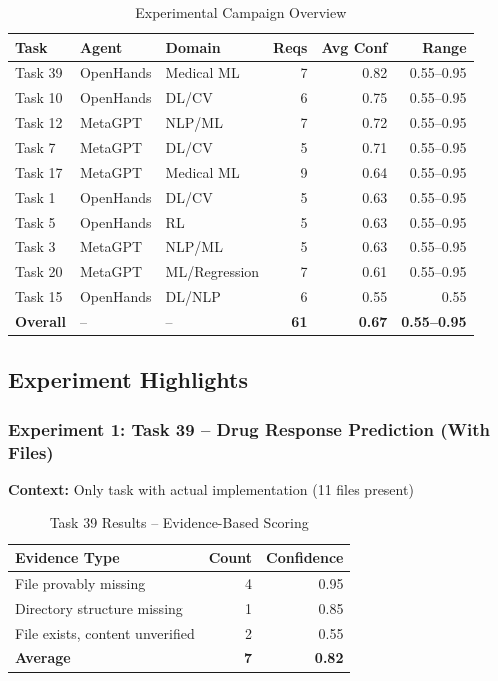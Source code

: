 \documentclass[11pt,a4paper]{article}
\begin{document}
\begin{table}[H]
\centering
\caption{Experimental Campaign Overview}
\begin{tabularx}{\textwidth}{llXrrr}
\toprule
\textbf{Task} & \textbf{Agent} & \textbf{Domain} & \textbf{Reqs} & \textbf{Avg Conf} & \textbf{Range} \\
\midrule
Task 39 & OpenHands & Medical ML & 7 & 0.82 & 0.55--0.95 \\
Task 10 & OpenHands & DL/CV & 6 & 0.75 & 0.55--0.95 \\
Task 12 & MetaGPT & NLP/ML & 7 & 0.72 & 0.55--0.95 \\
Task 7 & MetaGPT & DL/CV & 5 & 0.71 & 0.55--0.95 \\
Task 17 & MetaGPT & Medical ML & 9 & 0.64 & 0.55--0.95 \\
Task 1 & OpenHands & DL/CV & 5 & 0.63 & 0.55--0.95 \\
Task 5 & OpenHands & RL & 5 & 0.63 & 0.55--0.95 \\
Task 3 & MetaGPT & NLP/ML & 5 & 0.63 & 0.55--0.95 \\
Task 20 & MetaGPT & ML/Regression & 7 & 0.61 & 0.55--0.95 \\
Task 15 & OpenHands & DL/NLP & 6 & 0.55 & 0.55 \\
\midrule
\textbf{Overall} & -- & -- & \textbf{61} & \textbf{0.67} & \textbf{0.55--0.95} \\
\bottomrule
\end{tabularx}
\label{tab:experiment-overview}
\end{table}

\subsection{Experiment Highlights}

\subsubsection{Experiment 1: Task 39 -- Drug Response Prediction (With Files)}

\textbf{Context:} Only task with actual implementation (11 files present)

\begin{table}[H]
\centering
\caption{Task 39 Results -- Evidence-Based Scoring}
\begin{tabular}{lrr}
\toprule
\textbf{Evidence Type} & \textbf{Count} & \textbf{Confidence} \\
\midrule
File provably missing & 4 & 0.95 \\
Directory structure missing & 1 & 0.85 \\
File exists, content unverified & 2 & 0.55 \\
\midrule
\textbf{Average} & \textbf{7} & \textbf{0.82} \\
\bottomrule
\end{tabular}
\label{tab:task39-results}
\end{table}
\end{document}
